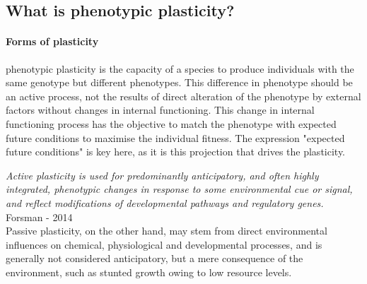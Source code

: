 \subsection{What is phenotypic plasticity?}

\paragraph{Forms of plasticity}
phenotypic plasticity is the capacity of a species to produce individuals with the same genotype but different phenotypes. This difference in phenotype should be an active process, not the results of direct alteration of the phenotype by external factors without changes in internal functioning. This change in internal functioning process has the objective  to match the phenotype with expected future conditions to maximise the individual fitness. The expression "expected future conditions" is key here, as it is this projection that drives the plasticity.

\textit{Active plasticity is used for predominantly anticipatory, and often highly integrated, phenotypic changes in response to some environmental cue or signal, and reflect modifications of developmental pathways and regulatory genes.} Forsman - 2014\\


Passive plasticity, on the other hand, may stem from direct environmental influences on chemical, physiological and developmental processes, and is generally not considered anticipatory, but a mere consequence of the environment, such as stunted growth owing to low resource levels.\\


